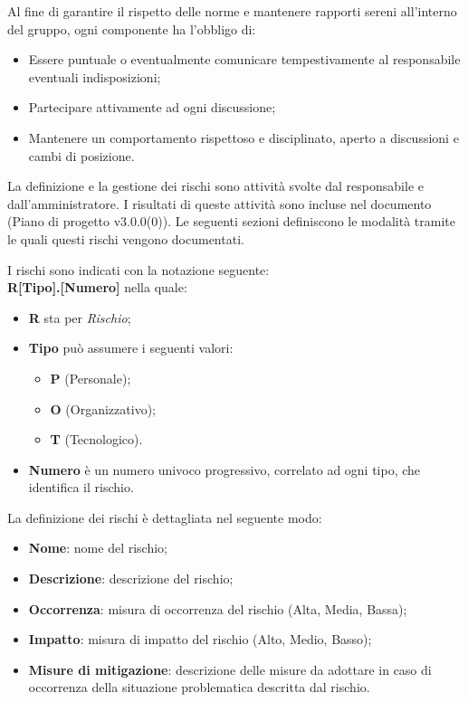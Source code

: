 \documentclass[10pt, a4paper]{article}
\begin{document}
Al fine di garantire il rispetto delle norme e mantenere rapporti sereni all'interno del gruppo, ogni componente ha l'obbligo di:
\begin{itemize}
    \item Essere puntuale o eventualmente comunicare tempestivamente al responsabile eventuali indisposizioni;
    \item Partecipare attivamente ad ogni discussione;
    \item Mantenere un comportamento rispettoso e disciplinato, aperto a discussioni e cambi di posizione.
\end{itemize}

La definizione e la gestione dei rischi sono attività svolte dal responsabile e dall'amministratore.
I risultati di queste attività sono incluse nel documento (Piano di progetto v3.0.0(0)).
Le seguenti sezioni definiscono le modalità tramite le quali questi rischi vengono documentati.

I rischi sono indicati con la notazione seguente:\\
\textbf{R[Tipo].[Numero]}
nella quale:
\begin{itemize}
\item \textbf{R} sta per \textit{Rischio};
\item \textbf{Tipo} può assumere i seguenti valori:
    \begin{itemize}
	\item \textbf{P} (Personale);
	\item \textbf{O} (Organizzativo);
	\item \textbf{T} (Tecnologico).
    \end{itemize}
\item \textbf{Numero} è un numero univoco progressivo, correlato ad ogni tipo, che identifica il rischio.
\end{itemize}

La definizione dei rischi è dettagliata nel seguente modo:
\begin{itemize}
    \item \textbf{Nome}: nome del rischio;
    \item \textbf{Descrizione}: descrizione del rischio;
    \item \textbf{Occorrenza}: misura di occorrenza del rischio (Alta, Media, Bassa);
    \item \textbf{Impatto}: misura di impatto del rischio (Alto, Medio, Basso);
    \item \textbf{Misure di mitigazione}: descrizione delle misure da adottare in caso di occorrenza della situazione problematica descritta dal rischio.
\end{itemize}
\end{document}
